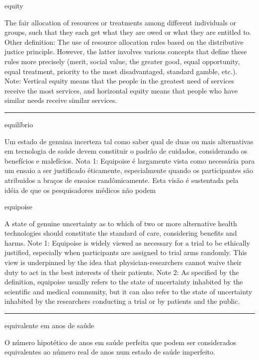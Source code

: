\documentclass[
  openany]{book}
\begin{document}
equity

The fair allocation of resources or treatments among different individuals or groups, such that they each get what they are owed or what they are entitled to. Other definition: The use of resource allocation rules based on the distributive justice principle. However, the latter involves various concepts that define these rules more precisely (merit, social value, the greater good, equal opportunity, equal treatment, priority to the most disadvantaged, standard gamble, etc.). Note: Vertical equity means that the people in the greatest need of services receive the most services, and horizontal equity means that people who have similar needs receive similar services.

\begin{center}\rule{0.5\linewidth}{0.5pt}\end{center}

equilíbrio

Um estado de genuina incerteza tal como saber qual de duas ou mais alternativas em tecnologia de saúde devem constituir o padrão de cuidados, considerando os benefícios e malefícios. Nota 1: Equipoise é largamente vista como necessária para um ensaio a ser justificado éticamente, especialmente quando os participantes são atribuidos a braços de ensaios randômicamente. Esta visão é sustentada pela idéia de que os pesquisadores médicos não podem

equipoise

A state of genuine uncertainty as to which of two or more alternative health technologies should constitute the standard of care, considering benefits and harms. Note 1: Equipoise is widely viewed as necessary for a trial to be ethically justified, especially when participants are assigned to trial arms randomly. This view is underpinned by the idea that physician-researchers cannot waive their duty to act in the best interests of their patients. Note 2: As specified by the definition, equipoise usually refers to the state of uncertainty inhabited by the scientific and medical community, but it can also refer to the state of uncertainty inhabited by the researchers conducting a trial or by patients and the public.

\begin{center}\rule{0.5\linewidth}{0.5pt}\end{center}

equivalente em anos de saúde

O número hipotético de anos em saúde perfeita que podem ser considerados equivalentes ao número real de anos num estado de saúde imperfeito.
\end{document}
